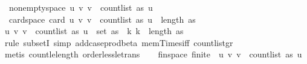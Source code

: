\begin{isabellebody}
\ \ non{\isacharunderscore}{\kern0pt}empty{\isacharunderscore}{\kern0pt}space{\isacharcolon}{\kern0pt}\ {\isachardoublequoteopen}{\isacharbraceleft}{\kern0pt}{\isacharparenleft}{\kern0pt}u{\isacharcomma}{\kern0pt}\ v{\isacharparenright}{\kern0pt}{\isachardot}{\kern0pt}\ v\ {\isacharless}{\kern0pt}\ count{\isacharunderscore}{\kern0pt}list\ as\ u{\isacharbraceright}{\kern0pt}\ {\isasymnoteq}\ {\isacharbraceleft}{\kern0pt}{\isacharbraceright}{\kern0pt}{\isachardoublequoteclose}\ \isanewline
\ \ card{\isacharunderscore}{\kern0pt}space{\isacharcolon}{\kern0pt}\ {\isachardoublequoteopen}card\ {\isacharbraceleft}{\kern0pt}{\isacharparenleft}{\kern0pt}u{\isacharcomma}{\kern0pt}\ v{\isacharparenright}{\kern0pt}{\isachardot}{\kern0pt}\ v\ {\isacharless}{\kern0pt}\ count{\isacharunderscore}{\kern0pt}list\ as\ u{\isacharbraceright}{\kern0pt}\ {\isacharequal}{\kern0pt}\ length\ as{\isachardoublequoteclose}\isanewline
%
\isadelimproof
%
\endisadelimproof
%
\isatagproof
{}\isamarkupfalse%
\ {\isacharminus}{\kern0pt}\isanewline
\ \ \isamarkupfalse%
\ {\isachardoublequoteopen}{\isacharbraceleft}{\kern0pt}{\isacharparenleft}{\kern0pt}u{\isacharcomma}{\kern0pt}\ v{\isacharparenright}{\kern0pt}{\isachardot}{\kern0pt}\ v\ {\isacharless}{\kern0pt}\ count{\isacharunderscore}{\kern0pt}list\ as\ u{\isacharbraceright}{\kern0pt}\ {\isasymsubseteq}\ set\ as\ {\isasymtimes}\ {\isacharbraceleft}{\kern0pt}k{\isachardot}{\kern0pt}\ k\ {\isacharless}{\kern0pt}\ length\ as{\isacharbraceright}{\kern0pt}{\isachardoublequoteclose}\isanewline
\ \ \ \ \isamarkupfalse%
\ {\isacharparenleft}{\kern0pt}rule\ subsetI{\isacharcomma}{\kern0pt}\ simp\ add{\isacharcolon}{\kern0pt}case{\isacharunderscore}{\kern0pt}prod{\isacharunderscore}{\kern0pt}beta\ mem{\isacharunderscore}{\kern0pt}Times{\isacharunderscore}{\kern0pt}iff\ count{\isacharunderscore}{\kern0pt}list{\isacharunderscore}{\kern0pt}gr{\isacharunderscore}{\kern0pt}{}{\isacharparenright}{\kern0pt}\isanewline
\ \ \ \ \isamarkupfalse%
\ {\isacharparenleft}{\kern0pt}metis\ count{\isacharunderscore}{\kern0pt}le{\isacharunderscore}{\kern0pt}length\ order{\isacharunderscore}{\kern0pt}less{\isacharunderscore}{\kern0pt}le{\isacharunderscore}{\kern0pt}trans{\isacharparenright}{\kern0pt}\isanewline
\isanewline
\ \ \isamarkupfalse%
\ fin{\isacharunderscore}{\kern0pt}space{\isacharcolon}{\kern0pt}\ {\isachardoublequoteopen}finite\ \ {\isacharbraceleft}{\kern0pt}{\isacharparenleft}{\kern0pt}u{\isacharcomma}{\kern0pt}\ v{\isacharparenright}{\kern0pt}{\isachardot}{\kern0pt}\ v\ {\isacharless}{\kern0pt}\ count{\isacharunderscore}{\kern0pt}list\ as\ u{\isacharbraceright}{\kern0pt}{\isachardoublequoteclose}\isanewline

\end{isabellebody}
